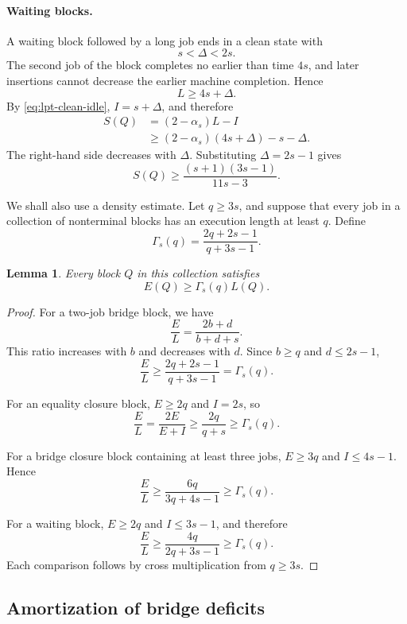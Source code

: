 \documentclass[11pt]{article}
\newtheorem{lemma}{Lemma}
\begin{document}
\paragraph{Waiting blocks.}
A waiting block followed by a long job ends in a clean state with
\[
s<\Delta<2s.
\]
The second job of the block completes no earlier than time \(4s\), and later
insertions cannot decrease the earlier machine completion. Hence
\[
L\ge4s+\Delta.
\]
By \eqref{eq:lpt-clean-idle}, \(I=s+\Delta\), and therefore
\[
\begin{aligned}
S(Q)
&=(2-\alpha_s)L-I\\
&\ge
(2-\alpha_s)(4s+\Delta)-s-\Delta.
\end{aligned}
\]
The right-hand side decreases with \(\Delta\). Substituting
\(\Delta=2s-1\) gives
\[
S(Q)
\ge
\frac{(s+1)(3s-1)}{11s-3}.
\tag{A.5}
\label{eq:lpt-waiting-surplus}
\]

We shall also use a density estimate. Let \(q\ge3s\), and suppose that every
job in a collection of nonterminal blocks has an execution length at least \(q\).
Define
\[
\Gamma_s(q)
=
\frac{2q+2s-1}{q+3s-1}.
\tag{A.6}
\label{eq:lpt-gamma}
\]

\begin{lemma}
\label{lem:lpt-block-density}
Every block \(Q\) in this collection satisfies
\[
E(Q)\ge\Gamma_s(q)L(Q).
\]
\end{lemma}

\begin{proof}
For a two-job bridge block, we have 
\[
\frac{E}{L}=\frac{2b+d}{b+d+s}.
\]
This ratio increases with \(b\) and decreases with \(d\). Since \(b\ge q\)
and \(d\le2s-1\),
\[
\frac{E}{L}
\ge
\frac{2q+2s-1}{q+3s-1}
=
\Gamma_s(q).
\]

For an equality closure block, \(E\ge2q\) and \(I=2s\), so
\[
\frac{E}{L}
=\frac{2E}{E+I}
\ge
\frac{2q}{q+s}
\ge
\Gamma_s(q).
\]

For a bridge closure block containing at least three jobs,
\(E\ge3q\) and \(I\le4s-1\). Hence
\[
\frac{E}{L}
\ge
\frac{6q}{3q+4s-1}
\ge
\Gamma_s(q).
\]

For a waiting block, \(E\ge2q\) and \(I\le3s-1\), and therefore
\[
\frac{E}{L}
\ge
\frac{4q}{2q+3s-1}
\ge
\Gamma_s(q).
\]
Each comparison follows by cross multiplication from \(q\ge3s\).
\end{proof}

\subsection{Amortization of bridge deficits}
\label{appsub:lpt-bridge-amortisation}
\end{document}

